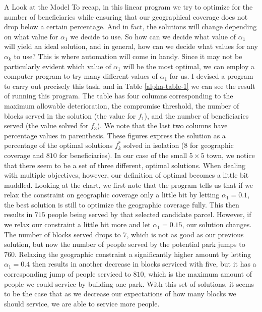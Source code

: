 \documentclass[12pt]{pom_thesis}
\theoremstyle{definition}
\begin{document}
\begin{chapter}{A Look at the Model}
To recap, in this linear program we try to optimize for the number of beneficiaries while ensuring that our geographical coverage does not drop below a certain percentage. And in fact, the solutions will change depending on what value for $\alpha_1$ we decide to use. So how can we decide what value of $\alpha_1$ will yield an ideal solution, and in general, how can we decide what values for any $\alpha_k$ to use? This is where automation will come in handy. Since it may not be particularly evident which value of $\alpha_1$ will be the most optimal, we can employ a computer program to try many different values of $\alpha_1$ for us. I devised a program to carry out precisely this task, and in Table \ref{alpha-table-1} we can see the result of running this program. The table has four columns corresponding to the maximum allowable deterioration, the compromise threshold, the number of blocks served in the solution (the value for $f_1$), and  the number of beneficiaries served (the value solved for $f_3$). We note that the last two columns have percentage values in parenthesis. These figures express the solution as a percentage of the optimal solutions $f_k^*$ solved in isolation ($8$ for geographic coverage and $810$ for beneficiaries). In our case of the small $5 \times 5$ town, we notice that there seem to be a set of three different, optimal solutions. When dealing with multiple objectives, however, our definition of optimal becomes a little bit muddled. Looking at the chart, we first note that the program tells us that if we relax the constraint on geographic coverage only a little bit by letting $\alpha_1 = 0.1$, the best solution is still to optimize the geographic coverage fully. This then results in $715$ people being served by that selected candidate parcel. However, if we relax our constraint a little bit more and let $\alpha_1 = 0.15$, our solution changes. The number of blocks served drops to $7$, which is not as good as our previous solution, but now the number of people served by the potential park jumps to $760$. Relaxing the geographic constraint a significantly higher amount by letting $\alpha_1 = 0.4$ then results in another decrease in blocks serviced with five, but it has a corresponding jump of people serviced to $810$, which is the maximum amount of people we could service by building one park. With this set of solutions, it seems to be the case that as we decrease our expectations of how many blocks we should service, we are able to service more people. \\


\end{chapter}
\end{document}
